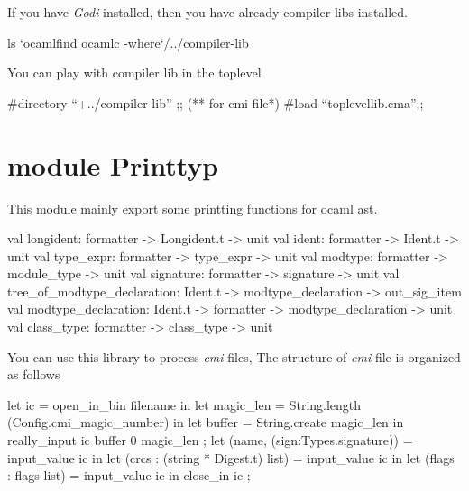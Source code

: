 If you have \textit{Godi} installed, then you have already compiler
libs installed.

\begin{bashcode}
ls `ocamlfind ocamlc -where`/../compiler-lib  
\end{bashcode}

You can play with compiler lib in the toplevel

\begin{ocamlcode}
  #directory ``+../compiler-lib'' ;; (** for cmi file*)
  #load ``toplevellib.cma'';;
\end{ocamlcode}

\section{module Printtyp}

This module mainly export some printting functions for ocaml ast.

\begin{ocamlcode}
  val longident: formatter -> Longident.t -> unit
  val ident: formatter -> Ident.t -> unit
  val type_expr: formatter -> type_expr -> unit
  val modtype: formatter -> module_type -> unit
  val signature: formatter -> signature -> unit
  val tree_of_modtype_declaration: Ident.t -> modtype_declaration -> out_sig_item
  val modtype_declaration: Ident.t -> formatter -> modtype_declaration -> unit
  val class_type: formatter -> class_type -> unit
\end{ocamlcode}

You can use this library to process \textit{cmi} files, The structure
of \textit{cmi} file is organized as follows

\begin{ocamlcode}
  let ic = open_in_bin filename in
  let magic_len = String.length (Config.cmi_magic_number) in
  let buffer = String.create magic_len in
  really_input ic buffer 0 magic_len ;
  let (name, (sign:Types.signature)) = input_value ic in
  let (crcs : (string * Digest.t) list) = input_value ic in
  let (flags : flags list) = input_value ic in
  close_in ic ;
\end{ocamlcode}
